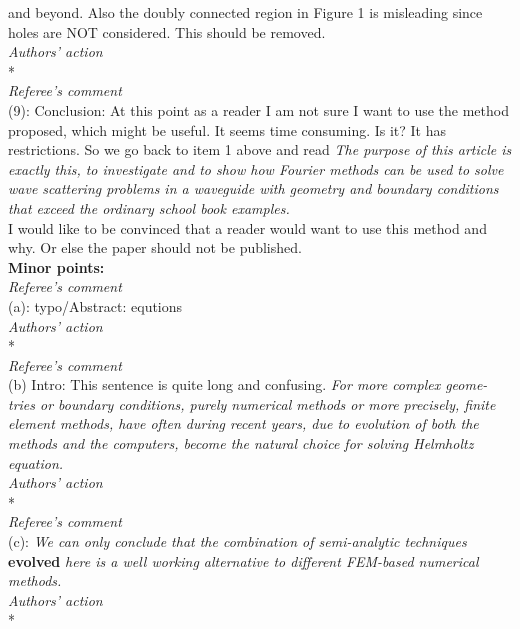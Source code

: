 \documentclass[a4paper,12pt]{article}%
\begin{document}
and beyond. Also the doubly connected region in Figure 1 is misleading since holes are
NOT considered. This should be removed.\\
{\it Authors' action}\\
*\\
\newline
{\it Referee's comment}\\
(9): Conclusion: At this point as a reader I am not sure I want to use the method
proposed, which might be useful. It seems time consuming. Is it? It has restrictions.
So we go back to item 1 above and read \textit{The purpose of this article is exactly this,
to investigate and to show how Fourier methods can be used to solve wave scattering
problems in a waveguide with geometry and boundary conditions that exceed the ordinary
school book examples.}\\
\newline
I would like to be convinced that a reader would want to use this method and why.
Or else the paper should not be published.\\
\newline
\textbf{Minor points:}\\
{\it Referee's comment}\\
(a): typo/Abstract: equtions\\
{\it Authors' action}\\
*\\
\newline
{\it Referee's comment}\\
(b) Intro: This sentence is quite long and confusing. \textit{For more complex geome-
tries or boundary conditions, purely numerical methods or more precisely, finite element
methods, have often during recent years, due to evolution of both the methods and the
computers, become the natural choice for solving Helmholtz equation.}\\
{\it Authors' action}\\
*\\
\newline
{\it Referee's comment}\\
(c): \textit{We can only conclude that the combination of semi-analytic techniques} \textbf{evolved}
\textit{here is a well working alternative to different FEM-based numerical methods.}\\
{\it Authors' action}\\
*
\end{document}
